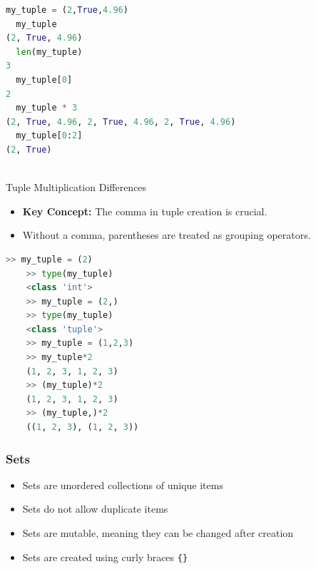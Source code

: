 \begin{frame}[fragile]
    \begin{lstlisting}[language=Python]
  my_tuple = (2,True,4.96)
  my_tuple
(2, True, 4.96)
  len(my_tuple)
3
  my_tuple[0]
2
  my_tuple * 3
(2, True, 4.96, 2, True, 4.96, 2, True, 4.96)
  my_tuple[0:2]
(2, True)
    
    \end{lstlisting}
\end{frame}
\begin{frame}[fragile]{Tuple Multiplication Differences}
    \begin{itemize}
      \item \textbf{Key Concept:} The comma in tuple creation is crucial.
      \item Without a comma, parentheses are treated as grouping operators.
    \end{itemize}
    \begin{lstlisting}[language=Python]
    >> my_tuple = (2)
    >> type(my_tuple)
    <class 'int'>
    >> my_tuple = (2,)
    >> type(my_tuple)
    <class 'tuple'>
    >> my_tuple = (1,2,3)
    >> my_tuple*2
    (1, 2, 3, 1, 2, 3)
    >> (my_tuple)*2
    (1, 2, 3, 1, 2, 3)
    >> (my_tuple,)*2
    ((1, 2, 3), (1, 2, 3))
    \end{lstlisting}
\end{frame}

\begin{frame}
    \frametitle{Sets}
    \begin{itemize}
        \item Sets are unordered collections of unique items
        \item Sets do not allow duplicate items
        \item Sets are mutable, meaning they can be changed after creation
        \item Sets are created using curly braces \texttt{\{\}}
    \end{itemize}   
\end{frame}

